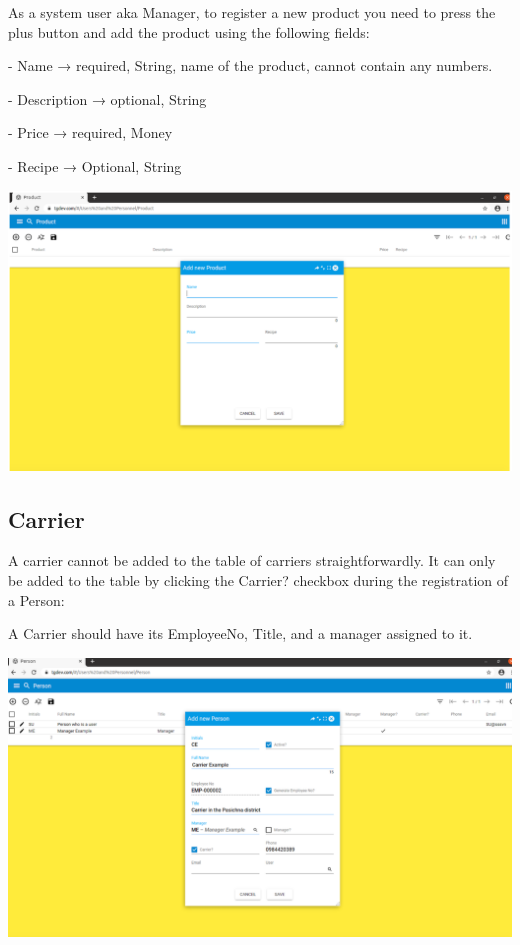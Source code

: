 As a system user aka Manager, to register a new product you need to press the plus button and add the product using the following fields:

- Name → required, String, name of the product, cannot contain any numbers.

- Description → optional, String

- Price → required, Money

- Recipe → Optional, String

\includegraphics[width=\textwidth]{sections/01-chapter/images/product2.png}

\subsection{Carrier}

A carrier cannot be added to the table of carriers straightforwardly. It can only be added to the table by clicking the Carrier? checkbox during the registration of a Person:

A Carrier should have its EmployeeNo, Title, and a manager assigned to it. 

\includegraphics[width=\textwidth]{sections/01-chapter/images/carrier1.png}

